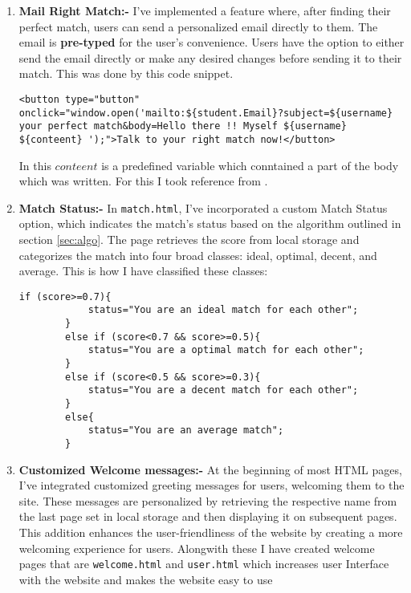 \documentclass{article}
\begin{document}
\begin{enumerate}
\item \textbf{Mail Right Match:-} 
I've implemented a feature where, after finding their perfect match, users can send a personalized email directly to them. The email is \textbf{pre-typed} for the user's convenience. Users have the option to either send the email directly or make any desired changes before sending it to their match. This was done by this code snippet.
\begin{lstlisting}[style=JavaScript]
<button type="button" onclick="window.open('mailto:${student.Email}?subject=${username} your perfect match&body=Hello there !! Myself ${username} ${conteent} ');">Talk to your right match now!</button>
\end{lstlisting}
In this $conteent$ is a predefined variable which conntained a part of the body which was written. For this I took reference from \cite{mailmatch}.
\item \textbf{Match Status:-} In \texttt{match.html}, I've incorporated a custom Match Status option, which indicates the match's status based on the algorithm outlined in section \ref{sec:algo}. The page retrieves the score from local storage and categorizes the match into four broad classes: ideal, optimal, decent, and average. This is how I have classified these classes:
\begin{lstlisting}[style=JavaScript]
        if (score>=0.7){
            status="You are an ideal match for each other";
        }
        else if (score<0.7 && score>=0.5){
            status="You are a optimal match for each other";
        }
        else if (score<0.5 && score>=0.3){
            status="You are a decent match for each other";
        }
        else{
            status="You are an average match";
        }
\end{lstlisting}

\item \textbf{Customized Welcome messages:-} At the beginning of most HTML pages, I've integrated customized greeting messages for users, welcoming them to the site. These messages are personalized by retrieving the respective name from the last page set in local storage and then displaying it on subsequent pages. This addition enhances the user-friendliness of the website by creating a more welcoming experience for users. Alongwith these I have created welcome pages that are \texttt{welcome.html} and \texttt{user.html} which increases user Interface with the website and makes the website easy to use

\end{enumerate}
\printbibliography
   
\end{document}
